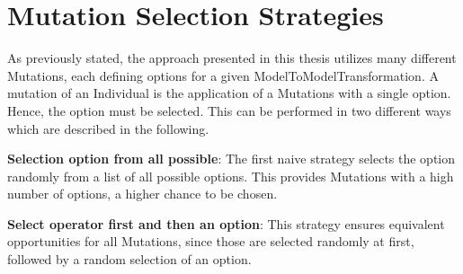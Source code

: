 \section{Mutation Selection Strategies}
\label{secMutationSelectionStrategies}

As previously stated, the approach presented in this thesis utilizes many different \glspl{Mutation}, each defining options for a given \gls{ModelToModelTransformation}. A mutation of an \gls{Individual} is the application of a \glspl{Mutation} with a single option. Hence, the option must be selected. This can be performed in two different ways which are described in the following.

\textbf{Selection option from all possible}: The first naive strategy selects the option randomly from a list of all possible options. This provides \glspl{Mutation} with a high number of options, a higher chance to be chosen.

\textbf{Select operator first and then an option}: This strategy ensures equivalent opportunities for all \glspl{Mutation}, since those are selected randomly at first, followed by a random selection of an option.
